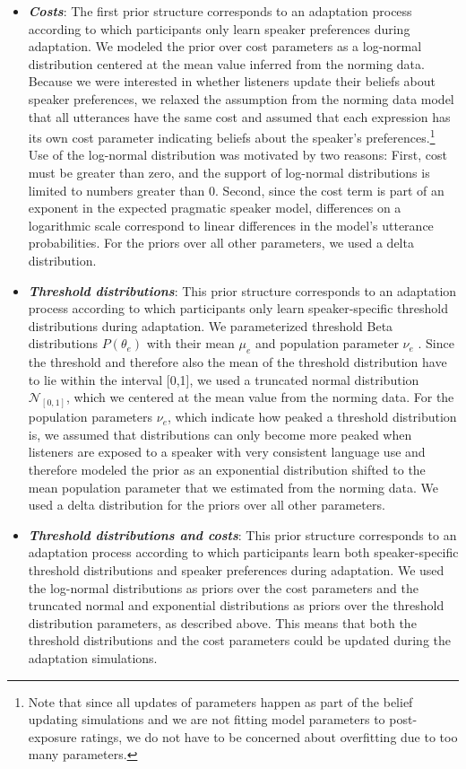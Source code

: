 \documentclass[man, floatsintext]{apa6}
\begin{document}
\begin{itemize}
\item \textbf{\textit{Costs}}: The first prior structure corresponds to an adaptation process according to which participants only learn speaker preferences during adaptation. 
We modeled the prior over cost parameters  as a log-normal distribution centered at the mean value inferred from the norming data. Because we were interested in whether listeners update their beliefs about speaker preferences, we relaxed the assumption from the norming data model that all utterances have the same cost and assumed that each expression has its own cost parameter indicating beliefs about the speaker's preferences.\footnote{Note that since all updates of parameters happen as part of the belief updating simulations and we are not fitting model parameters to post-exposure ratings, we do not have to be concerned about overfitting due to too many parameters.} Use of the log-normal distribution was motivated by two reasons: First, cost must be greater than zero, and the support of log-normal distributions is limited to numbers greater than 0. Second, since the cost term is part of an exponent in the expected pragmatic speaker model, differences on a logarithmic scale correspond to linear differences in the model's utterance probabilities. For the priors over all other parameters, we used a delta distribution.
\item \textbf{\textit{Threshold distributions}}:  This prior structure corresponds to an adaptation process according to which participants only learn speaker-specific threshold distributions during adaptation. We parameterized threshold Beta distributions $P(\theta_e)$ with their mean $\mu_e$ and population parameter $\nu_e$ \parencite{Kruschke2015}. Since the threshold and therefore also the mean of the threshold distribution have to lie within the interval [0,1], we used a truncated normal distribution $\mathscr{N}_{[0,1]}$, which we centered at the mean value from the norming data. For the population parameters $\nu_e$, which indicate how peaked a threshold distribution is, we assumed that distributions can only become more peaked when listeners are exposed to a speaker with very consistent language use and therefore modeled the prior as an exponential distribution shifted to the mean population parameter that we estimated from the norming data. We used a delta distribution for the priors over all other parameters.
\item  \textbf{\textit{Threshold distributions and costs}}:   This prior structure corresponds to an adaptation process according to which participants learn both speaker-specific threshold distributions and speaker preferences during adaptation.  We used the log-normal distributions as priors over the cost parameters and the truncated normal and exponential distributions as priors over the threshold distribution parameters, as described above. This means that both the threshold distributions and the cost parameters could be updated during the adaptation simulations.
\end{itemize}
\end{document}
